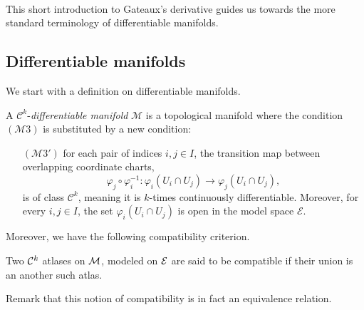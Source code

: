 \, 

This short introduction to Gateaux's derivative guides us towards the more standard terminology of  differentiable manifolds. 

\subsection{Differentiable manifolds}
We start with a definition on differentiable manifolds.

\begin{definition}
A \(\mathcal{C}^k\)-\textit{differentiable manifold} \(\mathcal{M}\) is a topological manifold where the condition  \((\mathcal{M}3)\) is substituted by a new condition:

\begin{itemize}
    \item[\((\mathcal{M}3')\)] for each pair of indices \(i, j \in I\), the transition map between overlapping coordinate charts,
    \[
    \varphi_j \circ \varphi_i^{-1} : \varphi_i(U_i \cap U_j) \to \varphi_j(U_i \cap U_j),
    \]
    is of class \(\mathcal{C}^{k}\), meaning it is \(k\)-times continuously differentiable. Moreover, for every \(i, j \in I\), the set \(\varphi_i(U_i \cap U_j)\) is open in the model space \(\mathcal{E}\).
\end{itemize}


\end{definition}

Moreover, we have the following compatibility criterion. 
\begin{definition}
Two $\mathcal{C}^{k}$ atlases on $\mathcal{M}$, modeled on  $\mathcal{E}$ are said to be compatible if their union is an another such atlas.
\end{definition}
Remark that this notion of compatibility is in fact an equivalence relation. 

